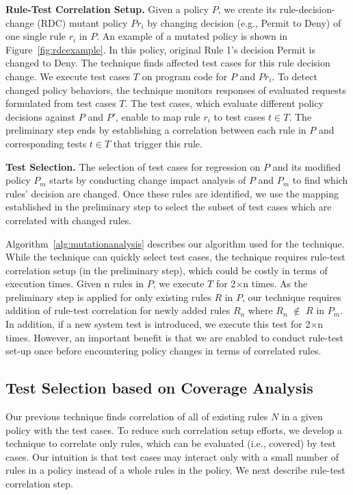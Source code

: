 \textbf{Rule-Test Correlation Setup.} Given a policy $P$, we create its rule-decision-change (RDC) mutant policy $Pr_i$ by changing decision (e.g., Permit to Deny) of one single rule $r_i$ in $P$.
An example of a mutated policy is shown in Figure~\ref{fig:rdcexample}. In this policy, 
original Rule 1's decision Permit is changed to Deny. The technique finds affected test cases for this rule decision change. 
We execute test cases $T$ on program code for $P$ and $Pr_i$. To detect changed policy behaviors, 
the technique monitors responses of evaluated requests formulated from test cases $T$. The test cases, which evaluate different 
policy decisions against $P$ and $P'$, enable to map rule $r_i$ to test cases $t \in T$. The preliminary step ends by establishing 
a correlation between each rule in $P$ and corresponding tests $t \in T$ that trigger this rule.

\textbf{Test Selection.} 
The selection of test cases for regression on $P$ and its modified policy $P_m$ starts by conducting change impact analysis 
of $P$ and $P_m$ to find which rules' decision are changed. 
Once these rules are identified, we use the mapping established in the preliminary step to select the subset of 
test cases which are correlated with changed rules.

Algorithm~\ref{alg:mutationanalysis} describes our algorithm used for the technique.
While the technique can quickly select test cases, the technique requires rule-test correlation setup 
(in the preliminary step), which could be costly in terms of execution times. Given n rules in $P$, we execute $T$ for 2$\times$n times. 
As the preliminary step is applied for only existing rules $R$ in $P$, our technique requires addition of rule-test
correlation for newly added rules $R_n$ where $R_n$ $\notin$ $R$ in $P_m$. 
In addition, if a new system test is introduced, we execute this test for 2$\times$n times.
However, an important benefit is that we are enabled to conduct rule-test set-up once before encountering policy 
changes in terms of correlated rules. 


\subsection{Test Selection based on Coverage Analysis}
Our previous technique finds correlation of all of existing rules $N$ in a given policy with the test cases. To reduce
such correlation setup efforts, we develop a technique to correlate only rules, which can be evaluated (i.e., covered)
by test cases. Our intuition is that test cases may interact only with a small number of rules in a policy
instead of a whole rules in the policy. We next describe rule-test correlation step.


